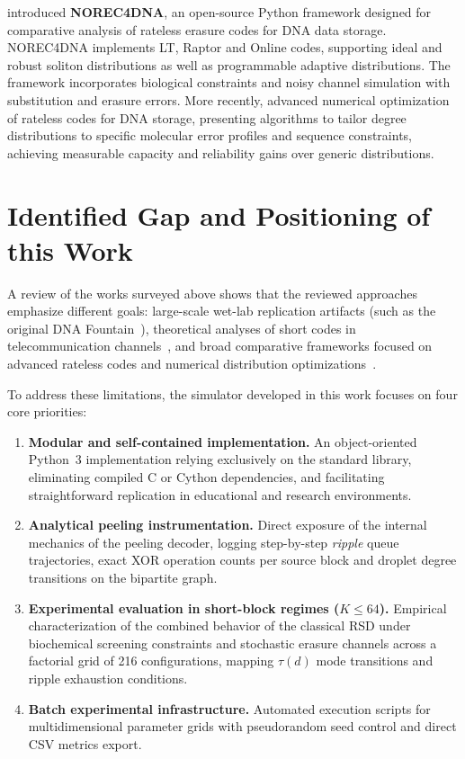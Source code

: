  introduced \textbf{NOREC4DNA}, an open-source Python framework designed for comparative analysis of rateless erasure codes for DNA data storage. NOREC4DNA implements LT, Raptor and Online codes, supporting ideal and robust soliton distributions as well as programmable adaptive distributions. The framework incorporates biological constraints and noisy channel simulation with substitution and erasure errors. More recently,  advanced numerical optimization of rateless codes for DNA storage, presenting algorithms to tailor degree distributions to specific molecular error profiles and sequence constraints, achieving measurable capacity and reliability gains over generic distributions.

\section{Identified Gap and Positioning of this Work}
\label{sec:identified_gap}

A review of the works surveyed above shows that the reviewed approaches emphasize different goals: large-scale wet-lab replication artifacts (such as the original DNA Fountain~\cite{erlich2017}), theoretical analyses of short codes in telecommunication channels~\cite{hyytia2007}, and broad comparative frameworks focused on advanced rateless codes and numerical distribution optimizations~\cite{schwarz2021, schwarz2024}.

To address these limitations, the simulator developed in this work focuses on four core priorities:

\begin{enumerate}
    \item \textbf{Modular and self-contained implementation.} An object-oriented Python~3 implementation relying exclusively on the standard library, eliminating compiled C or Cython dependencies, and facilitating straightforward replication in educational and research environments.
    
    \item \textbf{Analytical peeling instrumentation.} Direct exposure of the internal mechanics of the peeling decoder, logging step-by-step \emph{ripple} queue trajectories, exact XOR operation counts per source block and droplet degree transitions on the bipartite graph.
    
    \item \textbf{Experimental evaluation in short-block regimes ($K \le 64$).} Empirical characterization of the combined behavior of the classical RSD under biochemical screening constraints and stochastic erasure channels across a factorial grid of 216 configurations, mapping $\tau(d)$ mode transitions and ripple exhaustion conditions.
    
    \item \textbf{Batch experimental infrastructure.} Automated execution scripts for multidimensional parameter grids with pseudorandom seed control and direct CSV metrics export.
\end{enumerate}


